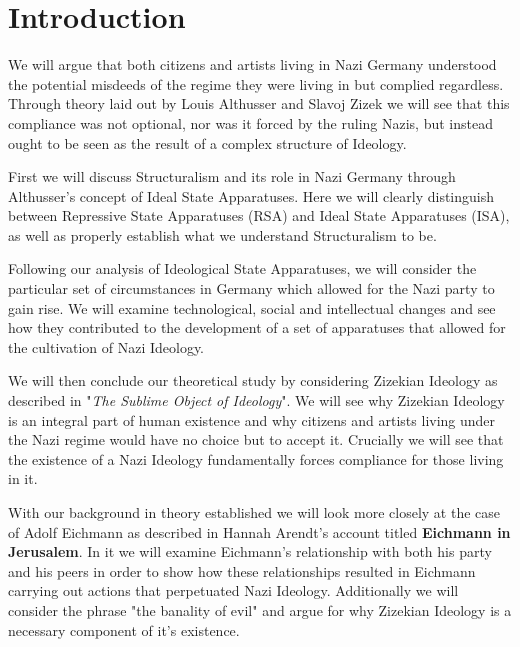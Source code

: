 \documentclass[a4paper, 11pt]{article} %
\begin{document}

\section*{Introduction}

We will argue that both citizens and artists living in Nazi Germany understood the potential misdeeds of the regime they were living in but complied regardless.  Through theory laid out by Louis Althusser and Slavoj Zizek we will see that this compliance was not optional, nor was it forced by the ruling Nazis, but instead ought to be seen as the result of a complex structure of Ideology.  

First we will discuss Structuralism and its role in Nazi Germany through Althusser's concept of Ideal State Apparatuses.  Here we will clearly distinguish between Repressive State Apparatuses (RSA) and Ideal State Apparatuses (ISA), as well as properly establish what we understand Structuralism to be.  

Following our analysis of Ideological State Apparatuses, we will consider the particular set of circumstances in Germany which allowed for the Nazi party to gain rise.  We will examine technological, social and intellectual changes and see how they contributed to the development of a set of apparatuses that allowed for the cultivation of Nazi Ideology.  

We will then conclude our theoretical study by considering Zizekian Ideology as described in "\textit{The Sublime Object of Ideology}".  We will see why Zizekian Ideology is an integral part of human existence and why citizens and artists living under the Nazi regime would have no choice but to accept it.  Crucially we will see that the existence of a Nazi Ideology fundamentally forces compliance for those living in it.  

With our background in theory established we will look more closely at the case of Adolf Eichmann as described in Hannah Arendt's account titled \textbf{Eichmann in Jerusalem}.  In it we will examine Eichmann's relationship with both his party and his peers in order to show how these relationships resulted in Eichmann carrying out actions that perpetuated Nazi Ideology.  Additionally we will consider the phrase "the banality of evil" and argue for why Zizekian Ideology is a necessary component of it's existence.  
\end{document}
